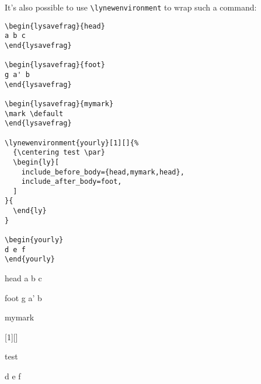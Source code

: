 \documentclass{lyluatexexample}
\begin{document}
It's also possible to use \verb`\lynewenvironment` to wrap such a command:

\begin{verbatim}
\begin{lysavefrag}{head}
a b c
\end{lysavefrag}

\begin{lysavefrag}{foot}
g a' b
\end{lysavefrag}

\begin{lysavefrag}{mymark}
\mark \default
\end{lysavefrag}

\lynewenvironment{yourly}[1][]{%
  {\centering test \par}
  \begin{ly}[
    include_before_body={head,mymark,head},
    include_after_body=foot,
  ]
}{
  \end{ly}
}

\begin{yourly}
d e f
\end{yourly}
\end{verbatim}

\begin{lysavefrag}{head}
a b c
\end{lysavefrag}

\begin{lysavefrag}{foot}
g a' b
\end{lysavefrag}

\begin{lysavefrag}{mymark}
\mark {}
\end{lysavefrag}

[1][]{%
  {\centering test \par}
  \begin{ly}[
    include_before_body={head,mymark,head},
    include_after_body=foot,
  ]
}{
  \end{ly}
}

\begin{yourly}
d e f
\end{yourly}
\end{document}
